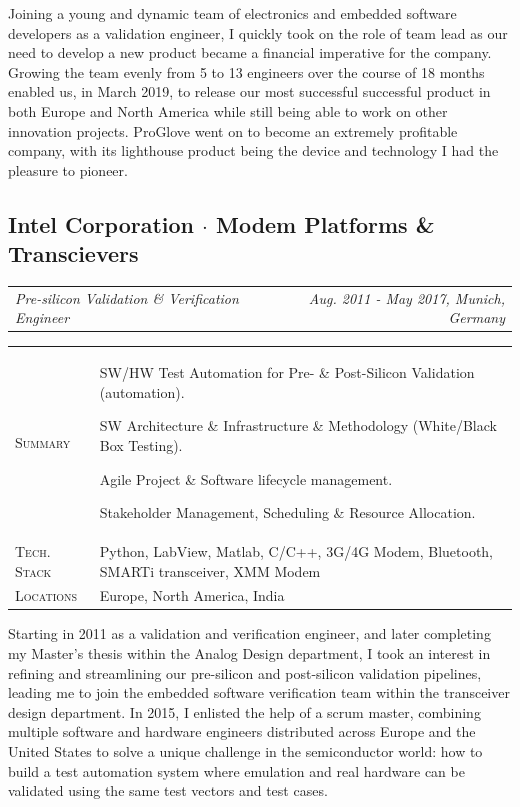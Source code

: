 \documentclass[10pt,a4paper]{moderncv}
\newcommand*{\makecareersubsection}[5]{
  \subsection{#1 {\color{color2}$\cdot$ #2}}
  \addvspace{-0.5em}
  {\color{color2}
  \begin{tabularx}{\textwidth}{LR}
    {\itshape #3} & {\itshape #4, #5}
  \end{tabularx}}
  \par\addvspace{1em}
  }
\begin{document}
  \vspace{1.5em}

  Joining a young and dynamic team of electronics and embedded software developers as a validation engineer, I quickly took on the role of team lead as our need to develop a new product became a financial imperative for the company. Growing the team evenly from 5 to 13 engineers over the course of 18 months enabled us, in March 2019, to release our most successful successful product in both Europe and North America while still being able to work on other innovation projects. ProGlove went on to become an extremely profitable company, with its lighthouse product being the device and technology I had the pleasure to pioneer.

\vspace{0.75em}

\makecareersubsection{Intel Corporation}{Modem Platforms \& Transcievers}
  {Pre-silicon Validation \& Verification Engineer}
  {Aug. 2011 - May 2017}
  {Munich, Germany}


  \vspace{1.5em}

  \begin{tabularx}{\textwidth}{>{\scshape}l@{\hskip 3.5mm}L}
    Summary & SW/HW Test Automation for Pre- \& Post-Silicon Validation (automation).
    \par SW Architecture \& Infrastructure \& Methodology (White/Black Box Testing).
    \par Agile Project \& Software lifecycle management. 
    \par Stakeholder Management, Scheduling \& Resource Allocation.\\
    Tech. Stack & Python, LabView, Matlab, C/C++, 3G/4G Modem, Bluetooth, SMARTi transceiver, XMM Modem\\
    Locations & Europe, North America, India\\
  \end{tabularx}

  \vspace{1.5em}

  Starting in 2011 as a validation and verification engineer, and later completing my Master's thesis within the Analog Design department, I took an interest in refining and streamlining our pre-silicon and post-silicon validation pipelines, leading me to join the embedded software verification team within the transceiver design department. In 2015, I enlisted the help of a scrum master, combining multiple software and hardware engineers distributed across Europe and the United States to solve a unique challenge in the semiconductor world: how to build a test automation system where emulation and real hardware can be validated using the same test vectors and test cases.
    
\end{document}
